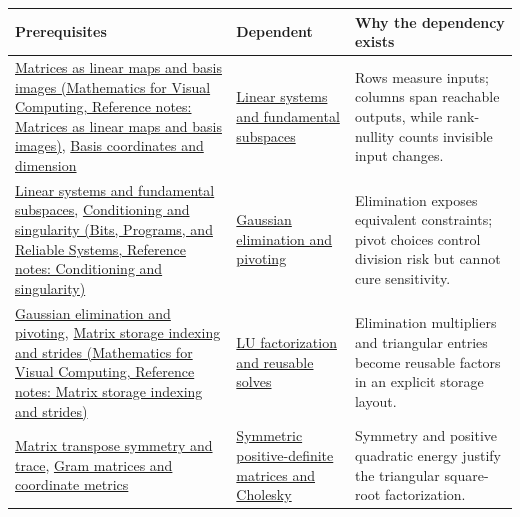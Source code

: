 {\def\LTcaptype{none} %
\begin{longtable}[]{@{}
  >{\raggedright\arraybackslash}p{}
  >{\raggedright\arraybackslash}p{}
  >{\raggedright\arraybackslash}p{}@{}}
\toprule\noalign{}
\begin{minipage}[b]{\linewidth}\raggedright
Prerequisites
\end{minipage} & \begin{minipage}[b]{\linewidth}\raggedright
Dependent
\end{minipage} & \begin{minipage}[b]{\linewidth}\raggedright
Why the dependency exists
\end{minipage} \\
\midrule\noalign{}
\endhead
\bottomrule\noalign{}
\endlastfoot
\href{../02-Mathematics-for-Visual-Computing/main.pdf\#nameddest=appendix-bd39c3bf5d64}{Matrices as linear maps and basis images (Mathematics for Visual Computing, Reference notes: Matrices as linear maps and basis images)}, \hyperref[appendix-ce0341f7ea0d]{Basis coordinates and dimension} & \hyperref[appendix-8572a4a060c1]{Linear systems and fundamental subspaces} & Rows measure inputs; columns span reachable outputs, while rank-nullity counts invisible input changes. \\
\hyperref[appendix-8572a4a060c1]{Linear systems and fundamental subspaces}, \href{../01-Bits-Programs-and-Reliable-Systems/main.pdf\#nameddest=appendix-8f6a01f284a7}{Conditioning and singularity (Bits, Programs, and Reliable Systems, Reference notes: Conditioning and singularity)} & \hyperref[appendix-f6e77f4a200f]{Gaussian elimination and pivoting} & Elimination exposes equivalent constraints; pivot choices control division risk but cannot cure sensitivity. \\
\hyperref[appendix-f6e77f4a200f]{Gaussian elimination and pivoting}, \href{../02-Mathematics-for-Visual-Computing/main.pdf\#nameddest=appendix-ffdc1d4e5350}{Matrix storage indexing and strides (Mathematics for Visual Computing, Reference notes: Matrix storage indexing and strides)} & \hyperref[appendix-55e4b5b0a1e6]{LU factorization and reusable solves} & Elimination multipliers and triangular entries become reusable factors in an explicit storage layout. \\
\hyperref[appendix-175ca5ff874d]{Matrix transpose symmetry and trace}, \hyperref[appendix-3b863809f82a]{Gram matrices and coordinate metrics} & \hyperref[appendix-50d2ea3c9b26]{Symmetric positive-definite matrices and Cholesky} & Symmetry and positive quadratic energy justify the triangular square-root factorization. \\

\end{longtable}}

